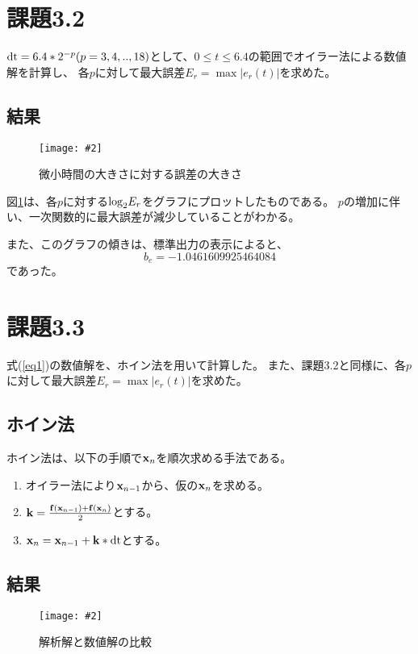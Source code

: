 \documentclass[11pt]{jsarticle}
\newcommand{\fg}[3]{ %
	\begin{figure}
		\texttt{[image: \#2]}
		\caption{#3}
		\label{#1}
	\end{figure}
}
\newcommand{\fr}[1]{図\ref{#1}}
\newcommand{\er}[1]{式(\ref{#1})}
\begin{document}
    \section{課題3.2}
        ${\rm dt} = 6.4 * 2^{-p} (p = 3,4,..,18)$として、$0 \leq t \leq 6.4$の範囲でオイラー法による数値解を計算し、
        各$p$に対して最大誤差$E_r = \max|e_r(t)|$を求めた。

        \subsection{結果}
            \fg{fig3}{graphs/euler/error_by_p.eps}{微小時間の大きさに対する誤差の大きさ}

            \fr{fig3}は、各$p$に対する${\rm log}_2E_r$をグラフにプロットしたものである。
            $p$の増加に伴い、一次関数的に最大誤差が減少していることがわかる。

            また、このグラフの傾きは、標準出力の表示によると、
            \[
                b_e = -1.0461609925464084
            \]
            であった。

    \section{課題3.3}
        \er{eq1}の数値解を、ホイン法を用いて計算した。
        また、課題3.2と同様に、各$p$に対して最大誤差$E_r = \max|e_r(t)|$を求めた。

        \subsection{ホイン法}
            ホイン法は、以下の手順で${\bf x}_{n}$を順次求める手法である。

            \begin{enumerate}
                \item オイラー法により${\bf x}_{n-1}$から、仮の${\bf x}_{n}$を求める。
                \item ${\bf k} = \frac{{\bf f}({\bf x}_{n-1}) + {\bf f}({\bf x}_{n})}{2}$とする。
                \item ${\bf x}_{n} = {\bf x}_{n-1} + {\bf k} * {\rm dt}$とする。
            \end{enumerate}

        \subsection{結果}
            \fg{fig4}{graphs/heun/rc_ra.eps}{解析解と数値解の比較} 
\end{document}
